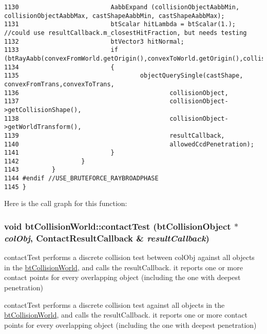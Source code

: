 \begin{Code}
\begin{verbatim}
1130                         AabbExpand (collisionObjectAabbMin, collisionObjectAabbMax, castShapeAabbMin, castShapeAabbMax);
1131                         btScalar hitLambda = btScalar(1.); //could use resultCallback.m_closestHitFraction, but needs testing
1132                         btVector3 hitNormal;
1133                         if (btRayAabb(convexFromWorld.getOrigin(),convexToWorld.getOrigin(),collisionObjectAabbMin,collisionObjectAabbMax,hitLambda,hitNormal))
1134                         {
1135                                 objectQuerySingle(castShape, convexFromTrans,convexToTrans,
1136                                         collisionObject,
1137                                         collisionObject->getCollisionShape(),
1138                                         collisionObject->getWorldTransform(),
1139                                         resultCallback,
1140                                         allowedCcdPenetration);
1141                         }
1142                 }
1143         }
1144 #endif //USE_BRUTEFORCE_RAYBROADPHASE
1145 }
\end{verbatim}
\end{Code}




Here is the call graph for this function:\hypertarget{classbt_collision_world_e1d167b53de82d4f97a47118f8480999}{
\subsubsection[contactTest]{\setlength{\rightskip}{0pt plus 5cm}void btCollisionWorld::contactTest (btCollisionObject $\ast$ {\em colObj}, \/  {\bf ContactResultCallback} \& {\em resultCallback})}}
\label{classbt_collision_world_e1d167b53de82d4f97a47118f8480999}


contactTest performs a discrete collision test between colObj against all objects in the \hyperlink{classbt_collision_world}{btCollisionWorld}, and calls the resultCallback. it reports one or more contact points for every overlapping object (including the one with deepest penetration)

contactTest performs a discrete collision test against all objects in the \hyperlink{classbt_collision_world}{btCollisionWorld}, and calls the resultCallback. it reports one or more contact points for every overlapping object (including the one with deepest penetration) 

